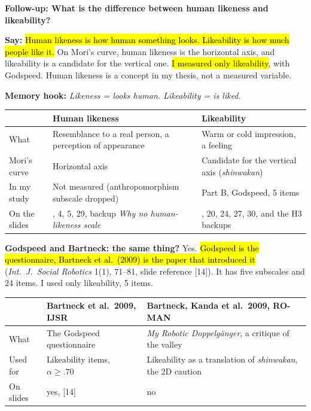 \documentclass[11pt,a4paper]{article}
\newcommand{\key}[1]{\hl{#1}}
\newcommand{\hook}[1]{{\setlength{\fboxsep}{1.5pt}\colorbox{hlyellow}{\color{black}#1}}}
\newcommand{\say}[1]{\begin{tcolorbox}[colback=knlight,colframe=knblue,boxrule=0.5pt,left=6pt,right=6pt,top=4pt,bottom=4pt]\textbf{Say:} #1\end{tcolorbox}}
\begin{document}
{\bfseries\color{knblue}Follow-up: What is the difference between human likeness and likeability?}\par\vspace{0.2em}

\say{\key{Human likeness is how human something looks. Likeability is how much people like it.} On Mori's curve, human likeness is the horizontal axis, and likeability is a candidate for the vertical one. \key{I measured only likeability}, with Godspeed. Human likeness is a concept in my thesis, not a measured variable.}

{\small\color{kngrey}\textbf{Memory hook:} \hook{\emph{Likeness = looks human. Likeability = is liked.}}}

{\small
\renewcommand{\arraystretch}{1.2}
\begin{tabular}{@{}>{\raggedright\arraybackslash}p{}>{\raggedright\arraybackslash}p{}>{\raggedright\arraybackslash}p{}@{}}
\toprule
& \textbf{Human likeness} & \textbf{Likeability} \\
\midrule
What & Resemblance to a real person, a perception of appearance & Warm or cold impression, a feeling \\
Mori's curve & Horizontal axis & Candidate for the vertical axis (\emph{shinwakan}) \\
In my study & Not measured (anthropomorphism subscale dropped) & Part B, Godspeed, 5 items \\
On the slides & 2, 4, 5, 29, backup \emph{Why no human-likeness scale} & 19, 20, 24, 27, 30, and the H3 backups \\
\bottomrule
\end{tabular}\par}
\vspace{0.3em}

\textbf{Godspeed and Bartneck: the same thing?} Yes. \key{Godspeed is the questionnaire, Bartneck et al.\ (2009) is the paper that introduced it} (\emph{Int.\ J.\ Social Robotics} 1(1), 71--81, slide reference [14]). It has five subscales and 24 items. I used only likeability, 5 items.

{\small
\renewcommand{\arraystretch}{1.15}
\begin{tabular}{@{}>{\raggedright\arraybackslash}p{}>{\raggedright\arraybackslash}p{}>{\raggedright\arraybackslash}p{}@{}}
\toprule
& \textbf{Bartneck et al.\ 2009, IJSR} & \textbf{Bartneck, Kanda et al.\ 2009, RO-MAN} \\
\midrule
What & The Godspeed questionnaire & \emph{My Robotic Doppelgänger}, a critique of the valley \\
Used for & Likeability items, $\alpha\geq.70$ & Likeability as a translation of \emph{shinwakan}, the 2D caution \\
On slides & yes, [14] & no \\
\bottomrule
\end{tabular}\par}
\vspace{0.3em}
\end{document}
